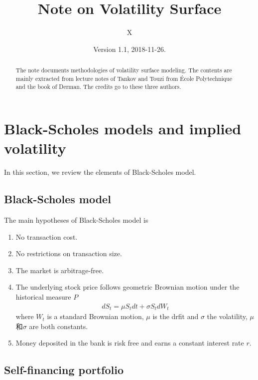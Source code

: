 \documentclass[10pt]{article}
\theoremstyle{plain}
\numberwithin{equation}{section}
\numberwithin{table}{section}
\newcommand{\s}{\sigma}
\begin{document}
\title{Note on Volatility Surface}
\author{X}
\date{Version 1.1, 2018-11-26.}

\maketitle

\begin{abstract}
The note documents methodologies of volatility surface modeling. The contents are mainly extracted
from lecture notes of Tankov\cite{Tankov} and Touzi\cite{Touzi} from \'Ecole Polytechnique and the book of Derman\cite{Derman}. 
The credits go to these three authors.
\end{abstract}

\tableofcontents

\newpage

\section{Black-Scholes models and implied volatility}\label{sect_BS}

In this section, we review the elements of Black-Scholes model.

\subsection{Black-Scholes model}

The main hypotheses of Black-Scholes model is 
\begin{enumerate}
    \item No transaction cost.
    \item No restrictions on transaction size.
    \item The market is arbitrage-free.
    \item The underlying stock price follows geometric Brownian motion under the historical measure $P$
    \begin{eqnarray}
          d S_t = \mu S_t dt+\s S_t d W_t
    \label{GBM}
    \end{eqnarray}
    where $W_t$ is a standard Brownian motion, $\mu$ is the drfit and $\s$ the volatility, $\mu$和$\s$ are both constants. 
    \item Money deposited in the bank is risk free and earns a constant interest rate $r$.    
\end{enumerate}

\subsection{Self-financing portfolio}
\end{document}
